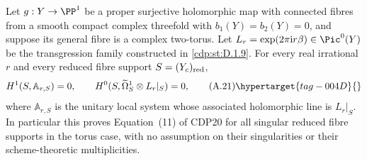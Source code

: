 \begin{proposition}\hypertarget{tag-01AX}{}\label{cdp:st:A.4.8}

Let $g:Y\to\PP^1$ be a proper surjective holomorphic map with connected fibres from a smooth compact complex threefold with $b_1(Y)=b_2(Y)=0$, and suppose its general fibre is a complex two-torus. Let $L_r=\exp(2\pi\mathrm i r\beta)\in\Pic^0(Y)$ be the transgression family constructed in \ref{cdp:st:D.1.9}. For every real irrational $r$ and every reduced fibre support $S=(Y_c)_{\rm red}$,
\[
 H^1(S,\mathbb A_{r,S})=0,
 \qquad
 H^0(S,\widetilde\Omega_S^1\otimes L_r|_S)=0,
 \tag{A.21}\hypertarget{tag-004D}{}\label{cdp:eq:A.21}
\]
where $\mathbb A_{r,S}$ is the unitary local system whose associated holomorphic line is $L_r|_S$. In particular this proves Equation~(11) of CDP20 for all singular reduced fibre supports in the torus case, with no assumption on their singularities or their scheme-theoretic multiplicities.
\end{proposition}


